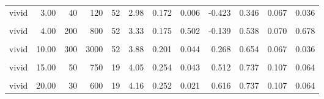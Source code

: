 \documentclass[
]{article}
\begin{document}
\begin{longtable}[t]{lrrrrrrlrrrl}
\hspace{1em}vivid & 3.00 & 40 & 120 & 52 & 2.98 & 0.172 & 0.006 & -0.423 & 0.346 & 0.067 & 0.036\\
\hspace{1em}\cellcolor{gray!10}{vivid} & \cellcolor{gray!10}{4.00} & \cellcolor{gray!10}{20} & \cellcolor{gray!10}{80} & \cellcolor{gray!10}{19} & \cellcolor{gray!10}{3.16} & \cellcolor{gray!10}{0.286} & \cellcolor{gray!10}{0.331} & \cellcolor{gray!10}{-0.282} & \cellcolor{gray!10}{0.474} & \cellcolor{gray!10}{0.121} & \cellcolor{gray!10}{>0.999}\\
\hspace{1em}vivid & 4.00 & 200 & 800 & 52 & 3.33 & 0.175 & 0.502 & -0.139 & 0.538 & 0.070 & 0.678\\
\hspace{1em}\cellcolor{gray!10}{vivid} & \cellcolor{gray!10}{10.00} & \cellcolor{gray!10}{40} & \cellcolor{gray!10}{400} & \cellcolor{gray!10}{19} & \cellcolor{gray!10}{3.68} & \cellcolor{gray!10}{0.236} & \cellcolor{gray!10}{0.392} & \cellcolor{gray!10}{0.184} & \cellcolor{gray!10}{0.632} & \cellcolor{gray!10}{0.117} & \cellcolor{gray!10}{0.359}\\
\hspace{1em}vivid & 10.00 & 300 & 3000 & 52 & 3.88 & 0.201 & 0.044 & 0.268 & 0.654 & 0.067 & 0.036\\
\hspace{1em}\cellcolor{gray!10}{vivid} & \cellcolor{gray!10}{15.00} & \cellcolor{gray!10}{20} & \cellcolor{gray!10}{300} & \cellcolor{gray!10}{52} & \cellcolor{gray!10}{3.87} & \cellcolor{gray!10}{0.190} & \cellcolor{gray!10}{0.050} & \cellcolor{gray!10}{0.269} & \cellcolor{gray!10}{0.635} & \cellcolor{gray!10}{0.068} & \cellcolor{gray!10}{0.070}\\
\hspace{1em}vivid & 15.00 & 50 & 750 & 19 & 4.05 & 0.254 & 0.043 & 0.512 & 0.737 & 0.107 & 0.064\\
\hspace{1em}\cellcolor{gray!10}{vivid} & \cellcolor{gray!10}{20.00} & \cellcolor{gray!10}{10} & \cellcolor{gray!10}{200} & \cellcolor{gray!10}{52} & \cellcolor{gray!10}{3.60} & \cellcolor{gray!10}{0.197} & \cellcolor{gray!10}{0.524} & \cellcolor{gray!10}{0.068} & \cellcolor{gray!10}{0.577} & \cellcolor{gray!10}{0.070} & \cellcolor{gray!10}{0.332}\\
\hspace{1em}vivid & 20.00 & 30 & 600 & 19 & 4.16 & 0.252 & 0.021 & 0.616 & 0.737 & 0.107 & 0.064\\

\end{longtable}
\end{document}
